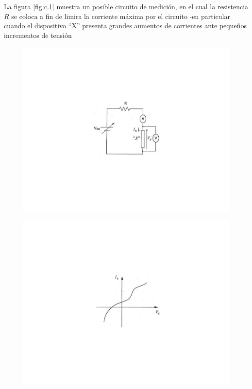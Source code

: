 \documentclass{book} %
\theoremstyle{definition}
\theoremstyle{definition}
\begin{document}
\begin{appendices}
La figura \ref{fig:c.1} muestra un posible circuito de medición, en el cual la resistencia $R$ se coloca a fin de limira la corriente máxima por el circuito -en particular cuando el dispositivo ``X'' presenta grandes aumentos de corrientes ante pequeños incrementos de tensión 

\begin{figure}[!htbp]
\centering
\begin{minipage}{.5\textwidth}
  \centering
  \includegraphics[scale=1]{figurac01.pdf}
  \label{fig:c.1}
\end{minipage}%
\begin{minipage}{.5\textwidth}
  \centering
  \includegraphics[scale=1]{figurac02.pdf}
  \label{fig:c.2}
\end{minipage}
\end{figure}


\end{appendices}
\end{document}
